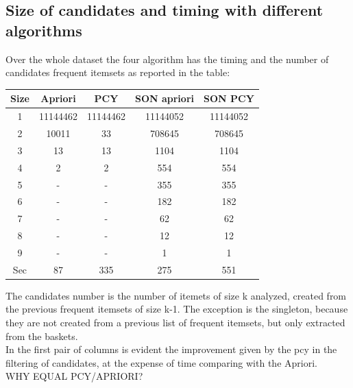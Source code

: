 \documentclass[14pt]{extarticle}
\begin{document}
\subsection{Size of candidates and timing with different algorithms}
Over the whole dataset the four algorithm has the timing and the number of candidates frequent itemsets as reported in the table:
\begin{center}
\begin{tabular}{ |c|c|c|c|c| } 
 \hline
 Size & Apriori & PCY & SON apriori & SON PCY \\
 \hline
 1 & 11144462 & 11144462 & 11144052 & 11144052\\ 
 2 & 10011 & 33 & 708645 & 708645\\ 
 3 & 13 & 13 & 1104 & 1104\\ 
 4 & 2 & 2 & 554 & 554 \\
 5 & - & - & 355 & 355 \\
 6 & - & - & 182 & 182 \\
 7 & - & - & 62 & 62 \\
 8 & - & - & 12 & 12 \\
 9 & - & - & 1 & 1 \\
 \hline
 Sec & 87 & 335 & 275 & 551\\
 \hline
\end{tabular}
\end{center}
The candidates number is the number of itemets of size k analyzed, created from the previous frequent itemsets of size k-1. The exception is the singleton, because they are not created from a previous list of frequent itemsets, but only extracted from the baskets.\\
In the first pair of columns is evident the improvement given by the pcy in the filtering of candidates, at the expense of time comparing with the Apriori.\\
WHY EQUAL PCY/APRIORI?
\end{document}
